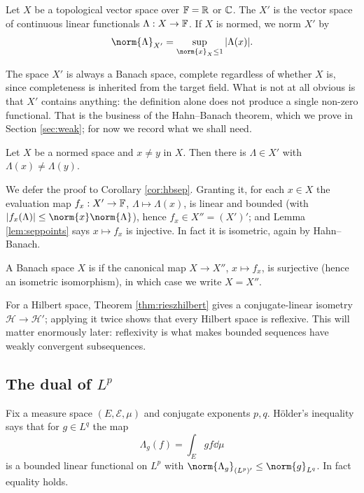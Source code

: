 \documentclass[a4paper]{scrartcl}
\newcommand{\Hil}{\mathcal{H}}
\begin{document}
\begin{definition}
	Let $X$ be a topological vector space over $\mathbb{F} = \mathbb{R}$ or $\mathbb{C}$. The  $X'$ is the vector space of continuous linear functionals $\Lambda : X \to \mathbb{F}$. If $X$ is normed, we norm $X'$ by
	$$\norm{\Lambda}_{X'} = \sup_{\norm{x}_X \le 1} |\Lambda(x)|.$$
\end{definition}

The space $X'$ is always a Banach space, complete regardless of whether $X$ is, since completeness is inherited from the target field. What is not at all obvious is that $X'$ contains anything: the definition alone does not produce a single non-zero functional. That is the business of the Hahn--Banach theorem, which we prove in Section \ref{sec:weak}; for now we record what we shall need.

\begin{lemma}\label{lem:seppoints}
	Let $X$ be a normed space and $x \ne y$ in $X$. Then there is $\Lambda \in X'$ with $\Lambda(x) \ne \Lambda(y)$.
\end{lemma}

We defer the proof to Corollary \ref{cor:hbsep}. Granting it, for each $x \in X$ the evaluation map $f_x : X' \to \mathbb{F}$, $\Lambda \mapsto \Lambda(x)$, is linear and bounded (with $|f_x(\Lambda)| \le \norm{x}\norm{\Lambda}$), hence $f_x \in X'' = (X')'$; and Lemma \ref{lem:seppoints} says $x \mapsto f_x$ is injective. In fact it is isometric, again by Hahn--Banach.

\begin{definition}[Reflexive]
	A Banach space $X$ is  if the canonical map $X \to X''$, $x \mapsto f_x$, is surjective (hence an isometric isomorphism), in which case we write $X = X''$.
\end{definition}

For a Hilbert space, Theorem \ref{thm:rieszhilbert} gives a conjugate-linear isometry $\Hil \to \Hil'$; applying it twice shows that every Hilbert space is reflexive. This will matter enormously later: reflexivity is what makes bounded sequences have weakly convergent subsequences.

\subsection{The dual of \texorpdfstring{$L^p$}{Lp}}

Fix a measure space $(E,\mathcal{E},\mu)$ and conjugate exponents $p,q$. H\"older's inequality says that for $g \in L^q$ the map
$$\Lambda_g(f) = \int_E gf \dd \mu$$
is a bounded linear functional on $L^p$ with $\norm{\Lambda_g}_{(L^p)'} \le \norm{g}_{L^q}$. In fact equality holds.
\end{document}
